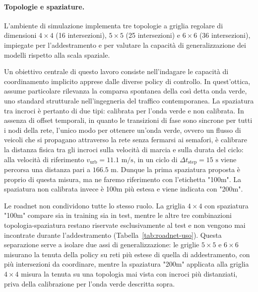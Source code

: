 \paragraph{Topologie e spaziature.}
L'ambiente di simulazione implementa tre topologie a griglia regolare di dimensioni $4\times4$ (16 intersezioni),
$5\times5$ (25 intersezioni) e $6\times6$ (36 intersezioni), impiegate per l'addestramento e per valutare la capacità di generalizzazione
dei modelli rispetto alla scala spaziale.

Un obiettivo centrale di questo lavoro consiste nell'indagare le capacità di coordinamento
implicito apprese dalle diverse policy di controllo. In quest'ottica, assume particolare
rilevanza la comparsa spontanea della così detta onda verde, uno standard strutturale nell'ingegneria del traffico contemporanea.
La spaziatura tra incroci è pertanto di due tipi: calibrata per l'onda verde e non calibrata.
In assenza di offset temporali, in quanto le transizioni di fase sono sincrone per tutti i nodi della rete,
l'unico modo per ottenere un'onda verde, ovvero un flusso di veicoli che si propagano
attraverso la rete senza fermarsi ai semafori, è calibrare la distanza fisica tra
gli incroci sulla velocità di marcia e sulla durata del ciclo:
alla velocità di riferimento $v_{\mathrm{urb}} = 11.1 \text{ m/s}$,
in un ciclo di $\Delta t_{\text{step}} = 15 \text{ s}$ viene percorsa una distanza pari a $166.5 \text{ m}$.
Dunque la prima spaziatura proposta è proprio di questa misura, ma ne faremo
riferimento con l'etichetta "100m".
La spaziatura non calibrata invece è 100m più estesa e viene indicata con "200m".

Le roadnet non condividono tutte lo stesso ruolo. La griglia $4\times4$ con spaziatura "100m" compare sia in training sia in test,
mentre le altre tre combinazioni topologia-spaziatura restano riservate esclusivamente al test e non vengono mai incontrate durante l'addestramento
(Tabella~\ref{tab:roadnet-uso}). Questa separazione serve a isolare due assi di generalizzazione: le griglie $5\times5$ e $6\times6$ misurano la tenuta
della policy su reti più estese di quella di addestramento, con più intersezioni da coordinare, mentre la spaziatura "200m" applicata alla griglia $4\times4$
misura la tenuta su una topologia mai vista con incroci più distanziati, priva della calibrazione per l'onda verde descritta sopra.

